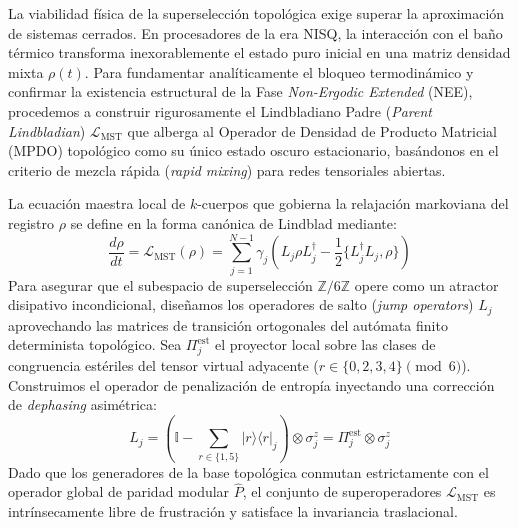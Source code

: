 \documentclass[12pt,a4paper]{article}
\theoremstyle{plain}
\theoremstyle{definition}
\theoremstyle{remark}
\begin{document}
La viabilidad física de la superselección topológica exige superar la aproximación de sistemas cerrados. En procesadores de la era NISQ, la interacción con el baño térmico transforma inexorablemente el estado puro inicial en una matriz densidad mixta $\rho(t)$. Para fundamentar analíticamente el bloqueo termodinámico y confirmar la existencia estructural de la Fase \textit{Non-Ergodic Extended} (NEE), procedemos a construir rigurosamente el Lindbladiano Padre (\textit{Parent Lindbladian}) $\mathcal{L}_{\text{MST}}$ que alberga al Operador de Densidad de Producto Matricial (MPDO) topológico como su único estado oscuro estacionario, basándonos en el criterio de mezcla rápida (\textit{rapid mixing}) para redes tensoriales abiertas.

La ecuación maestra local de $k$-cuerpos que gobierna la relajación markoviana del registro $\rho$ se define en la forma canónica de Lindblad \cite{Lindblad1976} mediante:
\begin{equation}
\frac{d\rho}{dt} = \mathcal{L}_{\text{MST}}(\rho) = \sum_{j=1}^{N-1} \gamma_j \left( L_j \rho L_j^\dagger - \frac{1}{2} \{ L_j^\dagger L_j, \rho \} \right)
\label{eq:lindblad_master}
\end{equation}
Para asegurar que el subespacio de superselección $\mathbb{Z}/6\mathbb{Z}$ opere como un atractor disipativo incondicional, diseñamos los operadores de salto (\textit{jump operators}) $L_j$ aprovechando las matrices de transición ortogonales del autómata finito determinista topológico. Sea $\Pi_j^{\text{est}}$ el proyector local sobre las clases de congruencia estériles del tensor virtual adyacente ($r \in \{0,2,3,4\} \pmod 6$). Construimos el operador de penalización de entropía inyectando una corrección de \textit{dephasing} asimétrica:
\begin{equation}
L_j = \left( \mathbb{I} - \sum_{r \in \{1,5\}} |r\rangle\langle r|_j \right) \otimes \sigma_j^z = \Pi_j^{\text{est}} \otimes \sigma_j^z
\label{eq:jump_operators}
\end{equation}
Dado que los generadores de la base topológica conmutan estrictamente con el operador global de paridad modular $\hat{P}$, el conjunto de superoperadores $\mathcal{L}_{\text{MST}}$ es intrínsecamente libre de frustración y satisface la invariancia traslacional.
\end{document}
